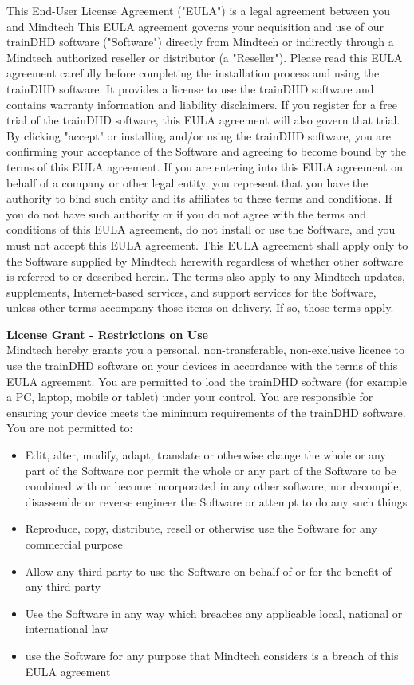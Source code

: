 \documentclass[letterpaper,10pt]{article}
\begin{document}
\begin{appendices}
This End-User License Agreement ("EULA") is a legal agreement between you and Mindtech
This EULA agreement governs your acquisition and use of our trainDHD software ("Software") directly from Mindtech or indirectly through a Mindtech authorized reseller or distributor (a "Reseller").
Please read this EULA agreement carefully before completing the installation process and using the trainDHD software. It provides a license to use the trainDHD software and contains warranty information and liability disclaimers.
If you register for a free trial of the trainDHD software, this EULA agreement will also govern that trial. By clicking "accept" or installing and/or using the trainDHD software, you are confirming your acceptance of the Software and agreeing to become bound by the terms of this EULA agreement.
If you are entering into this EULA agreement on behalf of a company or other legal entity, you represent that you have the authority to bind such entity and its affiliates to these terms and conditions. If you do not have such authority or if you do not agree with the terms and conditions of this EULA agreement, do not install or use the Software, and you must not accept this EULA agreement.
This EULA agreement shall apply only to the Software supplied by Mindtech herewith regardless of whether other software is referred to or described herein. The terms also apply to any Mindtech updates, supplements, Internet-based services, and support services for the Software, unless other terms accompany those items on delivery. If so, those terms apply.

\large{\textbf{License Grant - Restrictions on Use}} \\
Mindtech hereby grants you a personal, non-transferable, non-exclusive licence to use the trainDHD software on your devices in accordance with the terms of this EULA agreement.
You are permitted to load the trainDHD software (for example a PC, laptop, mobile or tablet) under your control. You are responsible for ensuring your device meets the minimum requirements of the trainDHD software.
You are not permitted to:
\begin{itemize}
\item Edit, alter, modify, adapt, translate or otherwise change the whole or any part of the Software nor permit the whole or any part of the Software to be combined with or become incorporated in any other software, nor decompile, disassemble or reverse engineer the Software or attempt to do any such things
\item Reproduce, copy, distribute, resell or otherwise use the Software for any commercial purpose
\item Allow any third party to use the Software on behalf of or for the benefit of any third party
\item Use the Software in any way which breaches any applicable local, national or international law
\item use the Software for any purpose that Mindtech considers is a breach of this EULA agreement
\end{itemize}


\end{appendices}
\end{document}
